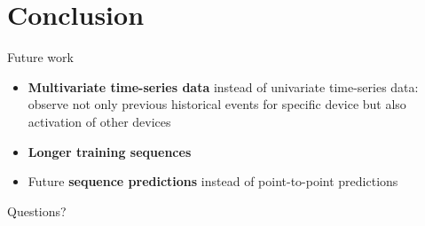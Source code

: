 \documentclass{beamer}
\begin{document}
  \section{Conclusion}
  \begin{frame}{Future work}
    \begin{itemize}
      \item \textbf{Multivariate time-series data} instead of univariate time-series data: observe not only previous historical events for specific device but also activation of other devices
      \item \textbf{Longer training sequences}
      \item Future \textbf{sequence predictions} instead of point-to-point predictions
    \end{itemize}
  \end{frame}

  \begin{frame}[standout]
    Questions?
  \end{frame}

  
\end{document}
